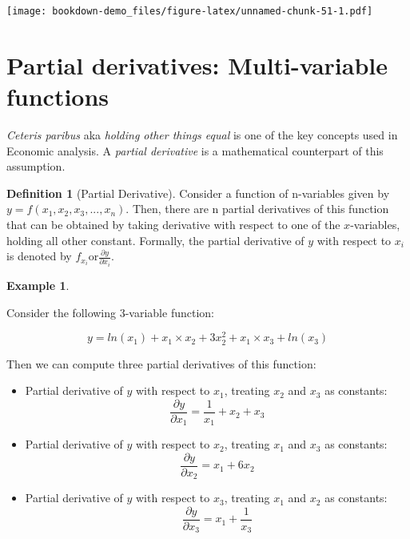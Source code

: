 \documentclass[
]{book}
\theoremstyle{definition}
\newtheorem{definition}{Definition}[chapter]
\theoremstyle{definition}
\newtheorem{example}{Example}[chapter]
\theoremstyle{definition}
\theoremstyle{definition}
\theoremstyle{remark}
\begin{document}
\texttt{[image: bookdown-demo\_files/figure-latex/unnamed-chunk-51-1.pdf]}

\hypertarget{partial-derivatives-multi-variable-functions}{%
\section{Partial derivatives: Multi-variable functions}\label{partial-derivatives-multi-variable-functions}}

\emph{Ceteris paribus} aka \emph{holding other things equal} is one of the key concepts used in Economic analysis. A \emph{partial derivative} is a mathematical counterpart of this assumption.

\begin{definition}[Partial Derivative]
\protect\hypertarget{def:unnamed-chunk-52}{}\label{def:unnamed-chunk-52}Consider a function of n-variables given by \(y=f(x_1,x_2, x_3,...,x_n)\). Then, there are n partial derivatives of this function that can be obtained by taking derivative with respect to one of the \(x\)-variables, holding all other constant. Formally, the partial derivative of \(y\) with respect to \(x_i\) is denoted by \(\displaystyle{f_{x_i} \text{or} \frac{\partial y}{\partial x_i}}\).
\end{definition}

\begin{example}
\protect\hypertarget{exm:unnamed-chunk-53}{}\label{exm:unnamed-chunk-53}

Consider the following 3-variable function:

\[y=ln(x_1)+x_1\times x_2+3x_2^2 + x_1 \times x_3 + ln(x_3)\]

Then we can compute three partial derivatives of this function:

\begin{itemize}
\item
  Partial derivative of \(y\) with respect to \(x_1\), treating \(x_2\) and \(x_3\) as constants:
  \[\frac{\partial y}{\partial x_1} = \frac{1}{x_1} + x_2+x_3\]
\item
  Partial derivative of \(y\) with respect to \(x_2\), treating \(x_1\) and \(x_3\) as constants:
  \[\frac{\partial y}{\partial x_2} = x_1+6x_2\]
\item
  Partial derivative of \(y\) with respect to \(x_3\), treating \(x_1\) and \(x_2\) as constants:
  \[\frac{\partial y}{\partial x_3} = x_1+ \frac{1}{x_3}\]
\end{itemize}

\end{example}
\end{document}
